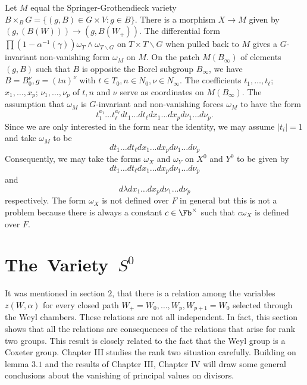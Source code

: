 \documentclass{memo-l}
\theoremstyle{definition}
\theoremstyle{remark}
\numberwithin{section}{chapter}
\numberwithin{equation}{chapter}
\begin{document}
Let $M$ equal the Springer-Grothendieck variety $B \times_{B}G = \{(g,B) \in
G \times V : g \in B\}$.
 There is a morphism $X {\to} M$ given by $(g,(B(W))) {\to} (g,B(W_{+}))$.
 The differential form $\prod (1-{\alpha}^{-1}({\gamma})){\omega}_{T}
\wedge
{\omega}_{T\backslash G}$ on $T \times T\backslash G$ when pulled back to $M$ gives a
$G$-invariant non-vanishing form ${\omega}_{M}$ on $M$.
 On the patch $M(B_{{\infty}})$ of elements $(g,B)$ such that $B$ is opposite
the Borel subgroup $B_{{\infty}}$, we have $B = B_{0}^{{\nu}}, g =
(tn)^{{\nu}}$ with $t \in T_{0}, n \in N_{0}, {\nu} \in N_{{\infty}}$.
 The coefficients $t_{1},\ldots ,t_\ell$; $x_1,\ldots ,x_p$;
$\nu_1, \ldots ,\nu_p$ of ${t}, {n}$ and ${{\nu}}$ serve as coordinates on
$M(B_{{\infty}})$.
 The assumption that ${\omega}_{M}$ is $G$-invariant and non-vanishing
forces ${\omega}_{M}$ to have the form
$$
t_{1}^{a_1} \ldots t_{\ell}^{a_\ell} dt_{1}\ldots
dt_{{\ell}}dx_{1} \ldots dx_{p}d{\nu}_{1}\ldots d{\nu}_{p} .
$$
Since we are only interested in the form near the identity, we may assume
$\vert t_{i}\vert =1$ and take ${\omega}_{M}$ to be
$$
dt_1\ldots dt_\ell dx_1 \ldots dx_p d\nu_1\ldots d\nu_p
$$
Consequently, we may take the forms ${\omega}_{X}$ and ${\omega}_{Y}$ on
$X^{0}$ and $Y^{0}$ to be given by
$$
dt_{1}\ldots dt_{{\ell}}dx_{1}\ldots dx_{p}d{\nu}_{1}\ldots d{\nu}_{p}
$$
and
$$
d{\lambda}dx_{1}\ldots dx_{p}d{\nu}_{1}\ldots d{\nu}_{p}
$$
respectively.  The form ${\omega}_{X}$ is not defined over $F$
in general but this is not a problem because there is always a
constant $c \in \Fb^{\times}$ such that $c{\omega}_{X}$ is defined over $F$.

\section{{The\ Variety\ $S^0$}}

   It was mentioned in section $2$, that there is a relation among the
variables $z(W,{\alpha})$ for every closed path $W_{+}=W_{0},\ldots ,
W_{p},W_{p+1}=W_{0}$ selected through the Weyl chambers.
 These relations are not all independent.
 In fact, this section shows that all the relations are consequences of
the relations that arise for rank two groups.
 This result is closely related to the fact that the Weyl group is a
Coxeter group.
 Chapter III studies the rank two situation carefully.
 Building on lemma $3.1$ and the results of Chapter III, Chapter IV will
draw some general conclusions about the vanishing of principal values on
divisors.
\end{document}
